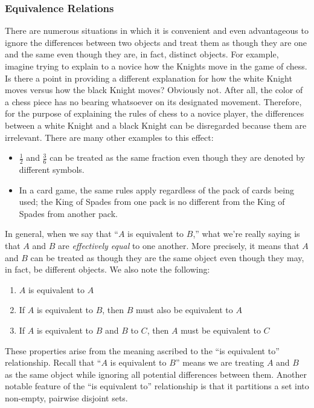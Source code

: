 \subsubsection{Equivalence Relations}
There are numerous situations in which it is convenient and even advantageous to
ignore the differences between two objects and treat them as though they are one
and the same even though they are, in fact, distinct objects.
For example, imagine trying to explain to a novice how the Knights move in the game of chess.
Is there a point in providing a different explanation for how the white Knight moves
versus how the black Knight moves?
Obviously not.
After all, the color of a chess piece has no bearing whatsoever on its designated movement.
Therefore, for the purpose of explaining the rules of chess to a novice player, the differences
between a white Knight and a black Knight can be disregarded because them are irrelevant.
There are many other examples to this effect:
\begin{itemize}[noitemsep]
    \item \( \frac{1}{2} \) and \( \frac{3}{6} \) can be treated as the same fraction even though they are denoted by different symbols.
    \item In a card game, the same rules apply regardless of the pack of cards being used; the King of Spades from one pack is no different
          from the King of Spades from another pack.
\end{itemize}
In general, when we say that ``\( A \) is equivalent to \( B \),'' what we're really saying is that
\( A \) and \( B \) are \emph{effectively equal} to one another. More precisely, it means that \( A \)
and \( B \) can be treated as though they are the same object even though they may, in fact, be different objects.
We also note the following:
\vspace{0cm}
\begin{enumerate}[topsep=2pt,noitemsep,label=\texttt{\textup{(\alph*)}}]
    \item \( A \) is equivalent to \( A \)
    \item If \( A \) is equivalent to \( B \), then \( B \) must also be equivalent to \( A \)
    \item If \( A \) is equivalent to \( B \) and \( B \) to \( C \), then \( A \) must be equivalent to \( C \)
\end{enumerate}
These properties arise from the meaning ascribed to the
``is equivalent to'' relationship.
Recall that ``\( A \) is equivalent to \( B \)'' means we are treating \( A \)
and \( B \) as the same object while ignoring all potential differences between them.
Another notable feature of the ``is equivalent to'' relationship is that it partitions
a set into non-empty, pairwise disjoint sets.


